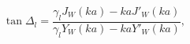 \begin{equation}
\label{Eq_0305}
\tan \Delta_l =
  \frac{\gamma_l J_W(ka) - ka J'_W(ka)}{\gamma_l Y_W(ka) - ka Y'_W(ka)},
\end{equation}

